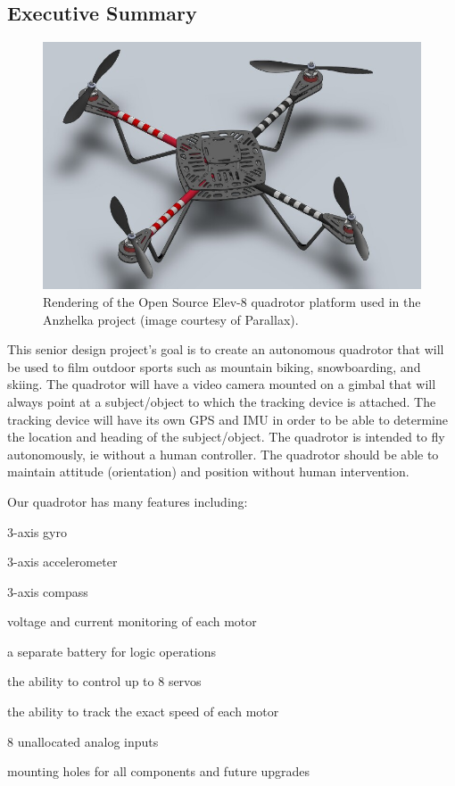 \documentclass{article}
\numberwithin{equation}{section} %
\begin{document}
\subsection{Executive Summary}
\begin{figure}[h!]
  \centering
	\includegraphics[scale=.6]{elev_8_rendering.JPG}
  \caption{Rendering of the Open Source Elev-8 quadrotor platform used in the Anzhelka project (image courtesy of Parallax).}
\end{figure}  

This senior design project's goal is to create an autonomous quadrotor that will be used to film outdoor sports such as mountain biking, snowboarding, and skiing. The quadrotor will have a video camera mounted on a gimbal that will always point at a subject/object to which the tracking device is attached. The tracking device will have its own GPS and IMU in order to be able to determine the location and heading of the subject/object. The quadrotor is intended to fly autonomously, ie without a human controller. The quadrotor should be able to maintain attitude (orientation) and position without human intervention.

Our quadrotor has many features including: 
\begin{list}{*}{}
	\item 3-axis gyro
	\item 3-axis accelerometer
	\item 3-axis compass
	\item voltage and current monitoring of each motor
	\item a separate battery for logic operations
	\item the ability to control up to 8 servos
	\item the ability to track the exact speed of each motor
	\item 8 unallocated analog inputs
	\item mounting holes for all components and future upgrades
\end{list}
\end{document}
